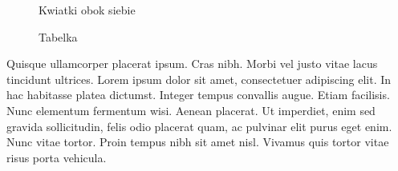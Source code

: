 \documentclass[a4paper,12pt]{article}
\begin{document}
	\newpage
	\begin{figure}
		\centering
		\caption{Kwiatki obok siebie}
	\end{figure}
	
	\begin{figure}
		\caption{Tabelka}
	\end{figure}
	Quisque ullamcorper placerat ipsum. Cras nibh. Morbi vel justo vitae
	lacus tincidunt ultrices. Lorem ipsum dolor sit amet, consectetuer adipiscing
	elit. In hac habitasse platea dictumst. Integer tempus convallis augue. Etiam
	facilisis. Nunc elementum fermentum wisi. Aenean placerat. Ut imperdiet,
	enim sed gravida sollicitudin, felis odio placerat quam, ac pulvinar elit purus
	eget enim. Nunc vitae tortor. Proin tempus nibh sit amet nisl. Vivamus quis
	tortor vitae risus porta vehicula.
\end{document}
